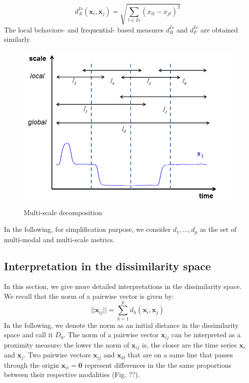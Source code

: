 \begin{equation}	
d^{Is}_A(\textbf{x}_i,\textbf{x}_j) = \sqrt{\sum\limits_{t \in Is} (x_{it}-x_{jt})^2}
\label{eq:A2}
\end{equation}
The local behaviors- and frequential- based measures $d^{Is}_B$ and $d^{Is}_F$ are obtained similarly.
\begin{figure}[h!]
	\centering
	\includegraphics[width=0.5\linewidth]{images/Intervalles3}
	\caption{Multi-scale decomposition}
	\label{fig:Intervalles}
\end{figure}

\noindent In the following, for simplification purpose, we consider $d_1, \ldots, d_p$ as the set of multi-modal and multi-scale metrics.

\subsection{Interpretation in the dissimilarity space}

In this section, we give more detailed interpretations in the dissimilarity space. 
We recall that the norm of a pairwise vector is given by: 
\begin{equation}
||\textbf{x}_{ij}|| = \sum\limits_{h=1}^{p} d_h(\textbf{x}_{i},\textbf{x}_{j})
\end{equation}
In the following, we denote the norm as an initial distance in the dissimilarity space and call it $D_0$. The norm of a pairwise vector $\textbf{x}_{ij}$ can be interpreted as a proximity measure: the lower the norm of $\textbf{x}_{ij}$ is, the closer are the time series $\textbf{x}_{i}$ and $\textbf{x}_{j}$. Two pairwise vectors $\textbf{x}_{ij}$ and $\textbf{x}_{kl}$ that are on a same line that passes through the origin $\textbf{x}_{ii} = \textbf{0}$ represent differences in the the same proportions between their respective modalities (Fig. ??). 

